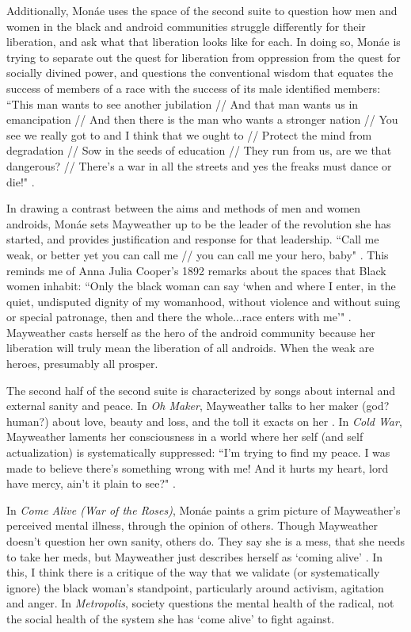\documentclass[a4paper, 11pt]{article} %
\begin{document}
Additionally, Mon\'ae uses the space of the second suite to question how men and women in the black and android communities struggle differently for their liberation, and ask what that liberation looks like for each.
In doing so, Mon\'ae is trying to separate out the quest for liberation from oppression from the quest for socially divined power, and questions the conventional wisdom that equates the success of members of a race with the success of its male identified members:
``This man wants to see another jubilation //
And that man wants us in emancipation //
And then there is the man who wants a stronger nation //
You see we really got to and I think that we ought to //
Protect the mind from degradation //
Sow in the seeds of education //
They run from us, are we that dangerous? //
There's a war in all the streets and yes the freaks must dance or die!" \cite{danceordie}.

In drawing a contrast between the aims and methods of men and women androids, Mon\'ae sets Mayweather up to be the leader of the revolution she has started, and provides justification and response for that leadership.
``Call me weak, or better yet you can call me // you can call me your hero, baby" \cite{faster}.
This reminds me of Anna Julia Cooper's 1892 remarks about the spaces that Black women inhabit:
``Only the black woman can say `when and where I enter, in the quiet, undisputed dignity of my womanhood, without violence and without suing or special patronage, then and there the whole...race enters with me'" \cite{cooper1892}.
Mayweather casts herself as the hero of the android community because her liberation will truly mean the liberation of all androids.
When the weak are heroes, presumably all prosper.

The second half of the second suite is characterized by songs about internal and external sanity and peace.
In \emph{Oh Maker}, Mayweather talks to her maker (god? human?) about love, beauty and loss, and the toll it exacts on her \cite{ohmaker}.
In \emph{Cold War}, Mayweather laments her consciousness in a world where her self (and self actualization) is systematically suppressed:
``I'm trying to find my peace.  I was made to believe there's something wrong with me! And it hurts my heart, lord have mercy, ain't it plain to see?" \cite{coldwar}. 

In \emph{Come Alive (War of the Roses)}, Mon\'ae paints a grim picture of Mayweather's perceived mental illness, through the opinion of others.
Though Mayweather doesn't question her own sanity, others do.  
They say she is a mess, that she needs to take her meds, but Mayweather just describes herself as `coming alive' \cite{comealive}.
In this, I think there is a critique of the way that we validate (or systematically ignore) the black woman's standpoint, particularly around activism, agitation and anger.
In \emph{Metropolis}, society questions the mental health of the radical, not the social health of the system she has `come alive' to fight against.
\end{document}
